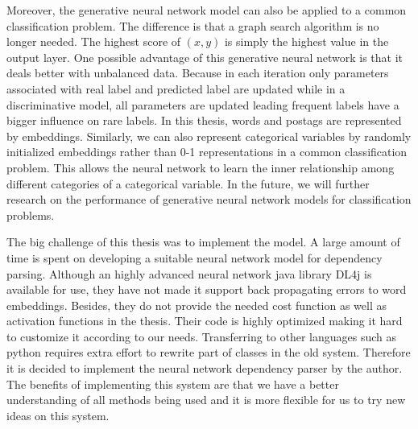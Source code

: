  Moreover, the generative neural network model can also be applied to a common classification problem. The difference is that a graph search algorithm is no longer needed. The highest score of $(x,y)$ is simply the highest value in the output layer. One possible advantage of this generative neural network is that it deals better with unbalanced data. Because in each iteration only parameters associated with real label and predicted label are updated while in a discriminative model, all parameters are updated leading frequent labels have a bigger influence on rare labels.  In this thesis, words and postags are represented by embeddings. Similarly, we can also represent categorical variables by randomly initialized embeddings rather than 0-1 representations in a common classification problem. This allows the neural network to learn the inner relationship among different categories of a categorical variable. In the future, we will further research on the performance of generative neural network models for classification problems.

The big challenge of this thesis was to implement the model. A large amount of time is spent on developing a suitable neural network model for dependency parsing. Although an highly advanced neural network java library DL4j is available for use, they have not made it support back propagating errors to word embeddings. Besides, they do not provide the needed cost function as well as activation functions in the thesis. Their code is highly optimized making it hard to customize it according to our needs. Transferring to other languages such as python requires extra effort to rewrite part of classes in the old system. Therefore it is decided to implement the neural network dependency parser by the author. The benefits of implementing this system are that we have a better understanding of all methods being used and it is more flexible for us to try new ideas on this system. 



